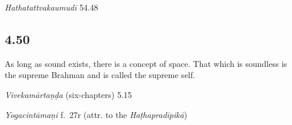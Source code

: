 \begin{ekdosis}

\begin{testimonia}[hp04_049*1]
\emph{Hathatattvakaumudī} 54.48
\begin{versinnote}
\end{versinnote}

\end{testimonia}


\subsection*{4.50}
\begin{translation}[hp04_050]
As long as sound exists, there is a concept of space. That which is soundless is the supreme Brahman and is called the supreme self.
\end{translation}

\begin{sources}[hp04_050]
\emph{Vivekamārtaṇḍa} (six-chapters) 5.15 %
\begin{versinnote}
\end{versinnote}
\end{sources}

\begin{testimonia}[hp04_050]
\emph{Yogacintāmaṇi} f.~27r (attr. to the \emph{Haṭhapradīpikā})
\begin{versinnote}
\end{versinnote}


\end{testimonia}
\end{ekdosis}
